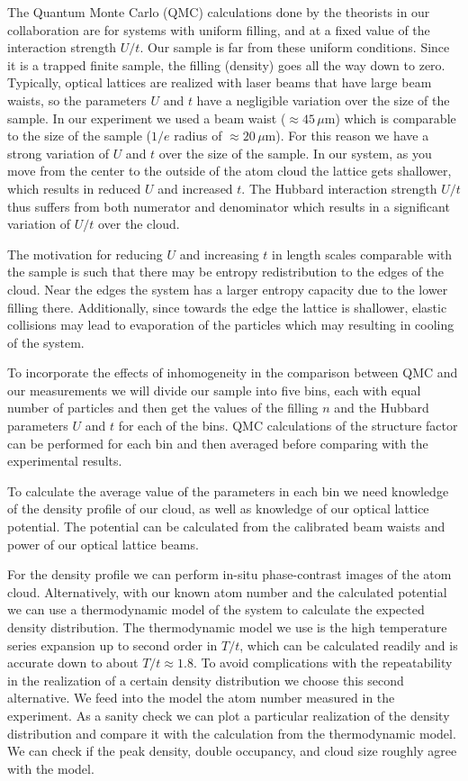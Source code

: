 \documentclass[11pt,letter]{article}
\begin{document}
The Quantum Monte Carlo (QMC) calculations done by the theorists in our
collaboration are for systems with uniform filling, and at a fixed value of the
interaction strength $U/t$. Our sample is far from these uniform conditions.
Since it is a trapped finite sample, the filling (density) goes all the way
down to zero.  Typically, optical lattices are realized with laser beams that
have large beam waists, so the parameters $U$ and $t$ have a negligible
variation over the size of the sample.  In our experiment we used a beam waist
($\approx 45\,\mu\text{m}$) which is comparable to the size of the sample
($1/e$ radius of $\approx 20\,\mu\text{m}$).   For this reason we have a strong
variation of $U$ and $t$ over the size of the sample.  In our system, as you
move from the center to the outside of the atom cloud the lattice gets
shallower, which results in reduced $U$ and increased $t$.   The Hubbard
interaction strength $U/t$ thus suffers from both numerator and denominator
which results in a significant variation of $U/t$ over the cloud. 

The motivation for reducing $U$ and increasing $t$ in length scales comparable
with the sample is such that there may be entropy redistribution to the edges
of the cloud.  Near the edges the system has a larger entropy capacity due to
the lower filling there. Additionally,  since towards the edge the lattice is
shallower, elastic collisions may lead to evaporation of the particles which
may resulting in cooling of the system. 

To incorporate the effects of inhomogeneity in the comparison between QMC and
our measurements we will divide our sample into five bins, each with equal
number of particles and then get the values of the filling $n$ and the Hubbard
parameters $U$ and $t$ for each of the bins. QMC
calculations of the structure factor can be performed for each bin and then
averaged before comparing with the experimental results. 

To calculate the average value of the parameters in each bin we need knowledge
of the density profile of our cloud, as well as knowledge of our optical
lattice potential. The potential can be calculated from the calibrated beam
waists and power of our optical lattice beams.   

For the density profile we can perform in-situ phase-contrast images of the
atom cloud.  Alternatively,  with our known atom number and the calculated
potential we can use a thermodynamic model of the system to calculate the
expected density distribution.   The thermodynamic model we use is the high
temperature series expansion up to second order in $T/t$, which can be
calculated readily and is accurate down to about $T/t \approx 1.8$.   To avoid
complications with the repeatability in the realization of a certain density
distribution we choose this second alternative.  We feed into the model the
atom number measured in the experiment. As a sanity check we can plot a
particular realization of the density distribution and compare it with the
calculation from the thermodynamic model.  We can check if the peak density,
double occupancy, and cloud size roughly agree with the model. 
\end{document}
